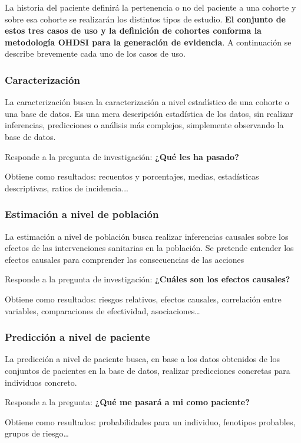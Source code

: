 La historia del paciente definirá la pertenencia o no del paciente a una cohorte y sobre esa cohorte se realizarán los distintos tipos de estudio. \textbf{El conjunto de estos tres casos de uso y la definición de cohortes conforma la metodología OHDSI para la generación de evidencia}. A continuación se describe brevemente cada uno de los casos de uso. 

\subsubsection{Caracterización}

La caracterización busca la caracterización a nivel estadístico de una cohorte o una base de datos. Es una mera descripción estadística de los datos, sin realizar inferencias, predicciones o análisis más complejos, simplemente observando la base de datos.

Responde a la pregunta de investigación: \textbf{¿Qué les ha pasado?}

Obtiene como resultados: recuentos y porcentajes, medias, estadísticas descriptivas, ratios de incidencia...

\subsubsection{Estimación a nivel de población}

La estimación a nivel de población busca realizar inferencias causales sobre los efectos de las intervenciones sanitarias en la población. Se pretende entender los efectos causales para comprender las consecuencias de las acciones

Responde a la pregunta de investigación: \textbf{¿Cuáles son los efectos causales?}

Obtiene como resultados: riesgos relativos, efectos causales, correlación entre variables, comparaciones de efectividad, asociaciones…

\subsubsection{Predicción a nivel de paciente}

La predicción a nivel de paciente busca, en base a los datos obtenidos de los conjuntos de pacientes en la base de datos, realizar predicciones concretas para individuos concreto.

Responde a la pregunta: \textbf{¿Qué me pasará a mi como paciente?}

Obtiene como resultados: probabilidades para un individuo, fenotipos probables, grupos de riesgo… 



